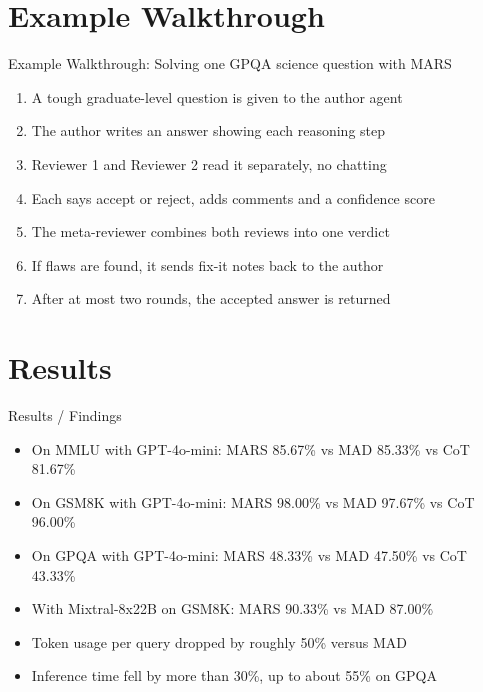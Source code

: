 \documentclass[10pt]{beamer}
\begin{document}
\section{Example Walkthrough}
\begin{frame}[allowframebreaks]{Example Walkthrough: Solving one GPQA science question with MARS}
\begin{enumerate}
  \item A tough graduate-level question is given to the author agent
  \item The author writes an answer showing each reasoning step
  \item Reviewer 1 and Reviewer 2 read it separately, no chatting
  \item Each says accept or reject, adds comments and a confidence score
  \item The meta-reviewer combines both reviews into one verdict
  \item If flaws are found, it sends fix-it notes back to the author
  \item After at most two rounds, the accepted answer is returned
\end{enumerate}
\end{frame}
\section{Results}
\begin{frame}[allowframebreaks]{Results / Findings}
\begin{itemize}
  \item On MMLU with GPT-4o-mini: MARS 85.67\% vs MAD 85.33\% vs CoT 81.67\%
  \item On GSM8K with GPT-4o-mini: MARS 98.00\% vs MAD 97.67\% vs CoT 96.00\%
  \item On GPQA with GPT-4o-mini: MARS 48.33\% vs MAD 47.50\% vs CoT 43.33\%
  \item With Mixtral-8x22B on GSM8K: MARS 90.33\% vs MAD 87.00\%
  \item Token usage per query dropped by roughly 50\% versus MAD
  \item Inference time fell by more than 30\%, up to about 55\% on GPQA
\end{itemize}
\end{frame}
\end{document}
